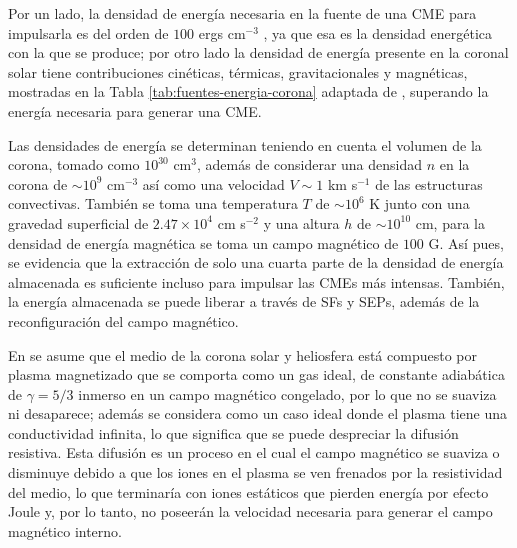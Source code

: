 Por un lado, la densidad de energía necesaria en la fuente de una CME para impulsarla es del orden de $100$ ergs cm$^{-3}$ \parencite[e.g.,][]{forbes-2000}, ya que esa es la densidad energética con la que se produce; por otro lado la densidad de energía presente en la coronal solar tiene contribuciones cinéticas, térmicas, gravitacionales y magnéticas, mostradas en la Tabla \ref{tab:fuentes-energia-corona} adaptada de \textcite[e.g.,][]{forbes-2000}, superando la energía necesaria para generar una CME. 

Las densidades de energía se determinan teniendo en cuenta el volumen de la corona, tomado como $10^{30}$ cm$^{3}$, además de considerar una densidad $n$ en la corona de $\sim 10^{9}$ cm$^{-3}$ así como una velocidad $V\sim 1$ km s$^{-1}$ de las estructuras convectivas. También se toma una temperatura $T$ de $\sim 10^{6}$ K junto con una gravedad superficial de $2.47\times10^{4}$ cm s$^{-2}$ y una altura $h$ de $\sim10^{10}$ cm, para la densidad de energía magnética se toma un campo magnético de $100$ G. Así pues, se evidencia que la extracción de solo una cuarta parte de la densidad de energía almacenada es suficiente incluso para impulsar las CMEs más intensas. También, la energía almacenada se puede liberar a través de \acp{SF} y \acp{SEP}, además de la reconfiguración del campo magnético.

En \textcite[e.g.,][]{lugaz-2005} se asume que el medio de la corona solar y heliosfera está compuesto por plasma magnetizado que se comporta como un gas ideal, de constante adiabática de $\gamma=5/3$ inmerso en un campo magnético congelado, por lo que no se suaviza ni desaparece; además se considera como un caso ideal donde el plasma tiene una conductividad infinita, lo que significa que se puede despreciar la difusión resistiva. Esta difusión es un proceso en el cual el campo magnético se suaviza o disminuye debido a que los iones en el plasma se ven frenados por la resistividad del medio, lo que terminaría con iones estáticos que pierden energía por efecto Joule y, por lo tanto, no poseerán la velocidad necesaria para generar el campo magnético interno. 
 

